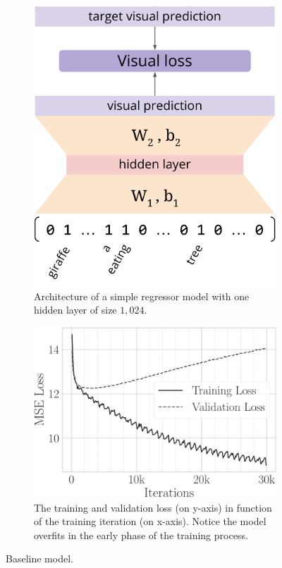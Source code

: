 \begin{figure}
\begin{subfigure}{0.37\textwidth}
\includegraphics[width=\linewidth]{visreg-arch}
\caption{Architecture of a simple regressor model with one hidden layer of size $1,024$.}
\label{fig:t2v:visreg:arch}
\end{subfigure}
\hfill
\begin{subfigure}{0.55\textwidth}
\includegraphics[width=\linewidth]{visreg-loss}
\caption{The training and validation loss (on y-axis) in function of the training iteration (on x-axis).
Notice the model overfits in the early phase of the training process.}
\label{fig:t2v:visreg:loss}
\end{subfigure}
\caption{Baseline \visreg{} model. }
\label{fig:t2v:visreg}
\end{figure}

